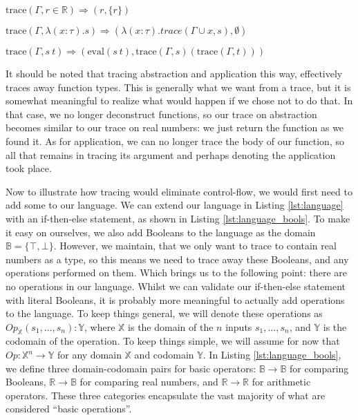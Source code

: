         \begin{quicklst}[caption=First tracing rules, label=lst:tracing, gobble=12]
            $\text{trace}(\Gamma,r\in\mathbb{R})\Rightarrow(r, \{r\})$

            $\text{trace}(\Gamma,\lambda(x:\tau).s)\Rightarrow(\lambda(x:\tau).trace(\Gamma\cup x, s),\emptyset)$

            $\text{trace}(\Gamma,s\ t)\Rightarrow(\text{eval}(s\ t),\text{trace}(\Gamma, s)(\text{trace}(\Gamma,t)))$
        \end{quicklst}

        It should be noted that tracing abstraction and application this way, effectively traces away function types.
        This is generally what we want from a trace, but it is somewhat meaningful to realize what would happen if we chose not to do that.
        In that case, we no longer deconstruct functions, so our trace on abstraction becomes similar to our trace on real numbers: we just return the function as we found it.
        As for application, we can no longer trace the body of our function, so all that remains in tracing its argument and perhaps denoting the application took place.

        Now to illustrate how tracing would eliminate control-flow, we would first need to add some to our language.
        We can extend our language in Listing \ref{lst:language} with an if-then-else statement, as shown in Listing \ref{lst:language_bools}.
        To make it easy on ourselves, we also add Booleans to the language as the domain $\mathbb{B}=\{\top,\bot\}$.
        However, we maintain, that we only want to trace to contain real numbers as a type, so this means we need to trace away these Booleans, and any operations performed on them.
        Which brings us to the following point: there are no operations in our language.
        Whilst we can validate our if-then-else statement with literal Booleans, it is probably more meaningful to actually add operations to the language.
        To keep things general, we will denote these operations as $Op_\mathbb{X}(s_1,\dots,s_n):\mathbb{Y}$, where $\mathbb{X}$ is the domain of the $n$ inputs $s_1,\dots,s_n$, and $\mathbb{Y}$ is the codomain of the operation.
        To keep things simple, we will assume for now that $Op:\mathbb{X}^n\to\mathbb{Y}$ for any domain $\mathbb{X}$ and codomain $\mathbb{Y}$.
        In Listing \ref{lst:language_bools}, we define three domain-codomain pairs for basic operators: $\mathbb{B}\to\mathbb{B}$ for comparing Booleans, $\mathbb{R}\to\mathbb{B}$ for comparing real numbers, and $\mathbb{R}\to\mathbb{R}$ for arithmetic operators.
        These three categories encapsulate the vast majority of what are considered ``basic operations''.

